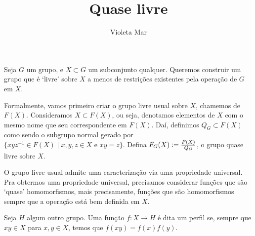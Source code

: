 \documentclass[11pt]{article}
\title{Quase livre}
\author{Violeta Mar}
\date{}
\newcommand{\defeq}{\vcentcolon=}
\theoremstyle{definition}
\theoremstyle{definition}
\theoremstyle{definition}
\theoremstyle{definition}
\theoremstyle{definition}
\theoremstyle{definition}
\theoremstyle{definition}
\theoremstyle{definition}
\newtheorem*{definition*}{Definição}
\newenvironment{definicao*}{
\definecolor{shadecolor}{HTML}{defcfc}
\begin{shaded}
\begin{definition*}
}
{
\end{definition*}
\end{shaded}
}
\theoremstyle{definition}
\theoremstyle{definition}
\theoremstyle{definition}
\theoremstyle{definition}
\theoremstyle{definition}
\begin{document}
\maketitle

Seja $G$ um grupo, e $X \subset G$ um subconjunto qualquer. Queremos construir um grupo que é `livre' sobre $X$ a menos de restrições existentes pela operação de $G$ em $X$.

Formalmente, vamos primeiro criar o grupo livre usual sobre $X$, chamemos de $F(X)$. Consideramos $X \subset F(X)$, ou seja, denotamos elementos de $X$ com o mesmo nome que seu correspondente em $F(X)$. Daí, definimos $Q_G \subset F(X)$ como sendo o subgrupo normal gerado por $\{xyz^{-1} \in F(X) \mid x,y,z \in X \text{ e } xy = z\}$. Defina $F_G(X) \defeq \frac{F(X)}{Q_G}$, o grupo quase livre sobre $X$.

O grupo livre usual admite uma caracterização via uma propriedade universal. Pra obtermos uma propriedade universal, precisamos considerar funções que são `quase' homomorfismos, mais precisamente, funções que são homomorfismos sempre que a operação está bem definida em $X$.

\begin{definicao*}[Perfis]
  Seja $H$ algum outro grupo. Uma função $f: X \rightarrow H$ é dita um perfil se, sempre que $xy \in X$ para $x,y \in X$, temos que $f(xy) = f(x)f(y)$.
\end{definicao*}
\end{document}
